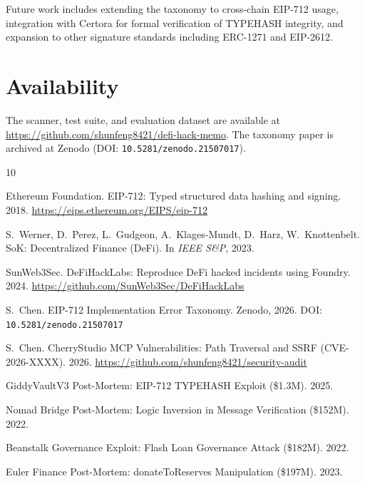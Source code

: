 \documentclass[runningheads]{llncs}
\begin{document}
Future work includes extending the taxonomy to cross-chain EIP-712 usage, integration with Certora for formal verification of TYPEHASH integrity, and expansion to other signature standards including ERC-1271 and EIP-2612.

\section*{Availability}

The scanner, test suite, and evaluation dataset are available at \url{https://github.com/shunfeng8421/defi-hack-memo}. The taxonomy paper is archived at Zenodo (DOI: \texttt{10.5281/zenodo.21507017}).


\begin{thebibliography}{10}

Ethereum Foundation. EIP-712: Typed structured data hashing and signing. 2018.
\url{https://eips.ethereum.org/EIPS/eip-712}

S.~Werner, D.~Perez, L.~Gudgeon, A.~Klages-Mundt, D.~Harz, W.~Knottenbelt.
SoK: Decentralized Finance (DeFi). In \textit{IEEE S\&P}, 2023.

SunWeb3Sec. DeFiHackLabs: Reproduce DeFi hacked incidents using Foundry. 2024.
\url{https://github.com/SunWeb3Sec/DeFiHackLabs}

S.~Chen. EIP-712 Implementation Error Taxonomy. Zenodo, 2026.
DOI: \texttt{10.5281/zenodo.21507017}

S.~Chen. CherryStudio MCP Vulnerabilities: Path Traversal and SSRF (CVE-2026-XXXX). 2026.
\url{https://github.com/shunfeng8421/security-audit}

GiddyVaultV3 Post-Mortem: EIP-712 TYPEHASH Exploit (\$1.3M). 2025.

Nomad Bridge Post-Mortem: Logic Inversion in Message Verification (\$152M). 2022.

Beanstalk Governance Exploit: Flash Loan Governance Attack (\$182M). 2022.

Euler Finance Post-Mortem: donateToReserves Manipulation (\$197M). 2023.

\end{thebibliography}
\end{document}
